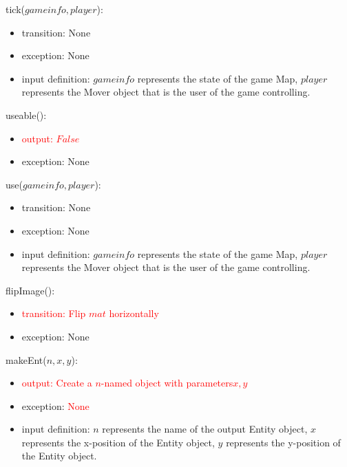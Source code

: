 \documentclass[12pt]{article}
\begin{document}
\noindent tick($gameinfo, player$):
\begin{itemize}
    \item transition: None
    \item exception: None
    \item input definition: $gameinfo$ represents the state of the game Map, $player$ represents the Mover object that is the user of the game controlling. 
\end{itemize}

\noindent useable():
\begin{itemize}
    \item \textcolor{red}{output: $False$}
    \item exception: None
\end{itemize}

\noindent use($gameinfo, player$):
\begin{itemize}
    \item transition: None
    \item exception: None
    \item input definition: $gameinfo$ represents the state of the game Map, $player$ represents the Mover object that is the user of the game controlling. 
\end{itemize}

\noindent flipImage():
\begin{itemize}
    \item \textcolor{red}{transition: Flip $mat$ horizontally}
    \item exception: None
\end{itemize}

\noindent makeEnt($n, x, y$):
\begin{itemize}
    \item \textcolor{red}{output: Create a $n$-named object with parameters$x, y$}
    \item exception: \textcolor{red}{None}
    \item input definition: $n$ represents the name of the output Entity object, $x$ represents the x-position of the Entity object, $y$ represents the y-position of the Entity object. 
\end{itemize}
\end{document}

